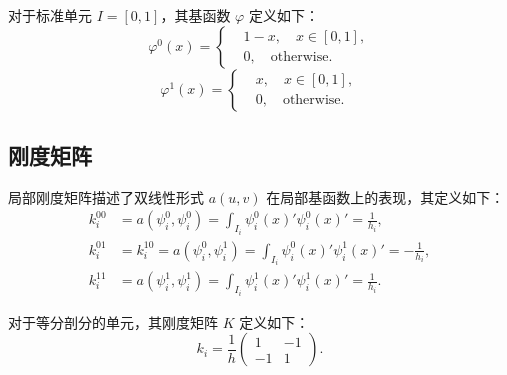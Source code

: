 \documentclass[11pt]{ctexart}
\begin{document}
对于标准单元 $ I = [0,1] $，其基函数 $ {\varphi} $ 定义如下：
\begin{equation}
     {\varphi}^0(x) = \left\{
          \begin{aligned}
               &1-x, \quad x \in [0,1], \\
               &0, \quad \text{otherwise}.
          \end{aligned}
     \right.
\end{equation}
\begin{equation}
     {\varphi}^1(x) = \left\{
          \begin{aligned}
               &x, \quad x \in [0,1], \\
               &0, \quad \text{otherwise}.
          \end{aligned}
     \right.
\end{equation}

\subsection{刚度矩阵}
局部刚度矩阵描述了双线性形式 $ a(u,v) $ 在局部基函数上的表现，其定义如下：
\begin{equation}
     \begin{aligned}
          k_{i}^{00}&= a(\psi_i^0,\psi_i^0) = \int_{I_i} \psi_i^0(x)' \psi_i^0(x)' = \frac{1}{h_i}, \\
          k_{i}^{01}&= k_{i}^{10}= a(\psi_i^0,\psi_i^1) = \int_{I_i} \psi_i^0(x)' \psi_i^1(x)' = -\frac{1}{h_i}, \\
          k_{i}^{11}&= a(\psi_i^1,\psi_i^1) = \int_{I_i} \psi_i^1(x)' \psi_i^1(x)' = \frac{1}{h_i}.
     \end{aligned}
\end{equation}

对于等分剖分的单元，其刚度矩阵 $ K$ 定义如下：
\begin{equation}
     k_i = \frac{1}{h} \begin{pmatrix}
          1 & -1 \\
          -1 & 1
     \end{pmatrix}.
\end{equation}
\end{document}
